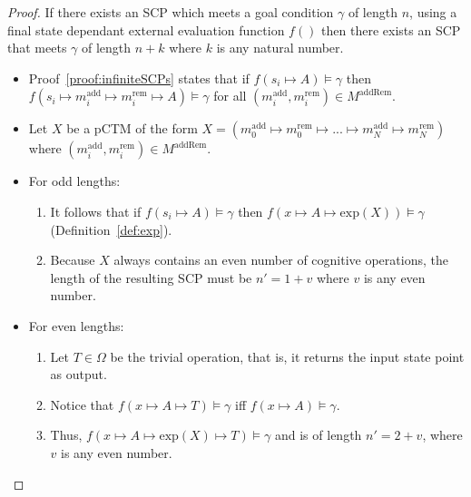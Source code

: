 \begin{proof} \label{proof:infiniteSCPLength}
If there exists an SCP which meets a goal condition $\gamma$ of length $n$, using a final state dependant external evaluation function $f()$ then there exists an SCP that meets $\gamma$ of length $n+k$ where $k$ is any natural number.

\begin{itemize}
\item Proof~\ref{proof:infiniteSCPs} states that if $f(s_i \longmapsto A)\models \gamma$ then $f(s_i \longmapsto m^\text{add}_i \longmapsto m^\text{rem}_i \longmapsto A) \models \gamma$ for all $(m^\text{add}_i, m^\text{rem}_i) \in M^\text{addRem}$.
\item Let $X$ be a pCTM of the form $X=(m^\text{add}_0 \longmapsto m^\text{rem}_0 \longmapsto ... \longmapsto m^\text{add}_N \longmapsto m^\text{rem}_{N})$ where $(m^\text{add}_i, m^\text{rem}_i) \in M^\text{addRem}$.
\item For odd lengths:
\begin{enumerate}
\item  It follows that if $f(s_i \longmapsto A)\models \gamma$ then $f(x \longmapsto A \longmapsto \textrm{exp}(X))\models \gamma$ (Definition~\ref{def:exp}).
\item Because $X$ always contains an even number of cognitive operations, the length of the resulting SCP must be $n' = 1+v$ where $v$ is any even number.
\end{enumerate}
\item For even lengths:
\begin{enumerate}
\item Let $T \in \Omega$ be the trivial operation, that is, it returns the input state point as output.
\item Notice that $f(x \longmapsto A \longmapsto T) \models \gamma$ iff $f(x \longmapsto A) \models \gamma$.
\item Thus, $f(x \longmapsto A \longmapsto \textrm{exp}(X) \longmapsto T )\models \gamma$ and is of length $n' = 2+v$, where $v$ is any even number.
\end{enumerate}
\end{itemize}

\end{proof}



